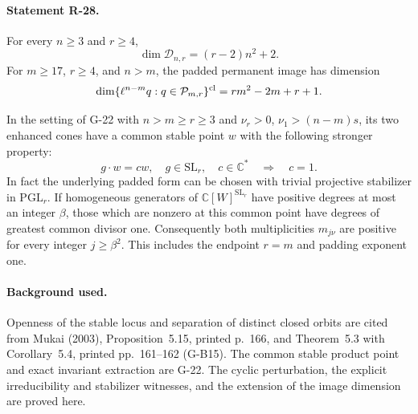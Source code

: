 \paragraph{Statement R-28.}
For every $n\geq3$ and $r\geq4$,
\begin{equation}\label{R28:det_dimension}
 \dim\mathcal D_{n,r}=(r-2)n^2+2.
\end{equation}
For $m\geq17$, $r\geq4$, and $n>m$, the padded permanent
image has dimension
\begin{equation}\label{R28:pad_dimension}
 \dim\{\ell^{n-m}q:q\in\mathcal P_{m,r}\}^{\rm cl}
       =rm^2-2m+r+1.
\end{equation}

In the setting of G-22 with $n>m\geq r\geq3$ and
$\nu_r>0$, $\nu_1>(n-m)s$, its two enhanced cones have a
common stable point $w$ with the following stronger property:
\begin{equation}\label{R28:no_scaling}
 g\cdot w=cw,\quad g\in\mathrm{SL}_r,\quad c\in\mathbb C^*
       \quad\Longrightarrow\quad c=1.
\end{equation}
In fact the underlying padded form can be chosen with trivial
projective stabilizer in $\mathrm{PGL}_r$.
If homogeneous generators of $\mathbb C[W]^{\mathrm{SL}_r}$
have positive degrees at most an integer $\beta$, those which
are nonzero at this common point have degrees of greatest common
divisor one. Consequently both multiplicities $m_{j\nu}$ are
positive for every integer $j\geq\beta^2$.
This includes the endpoint $r=m$ and padding exponent one.

\paragraph{Background used.}
Openness of the stable locus and separation of distinct closed
orbits are cited from Mukai (2003), Proposition~5.15, printed
p.~166, and Theorem~5.3 with Corollary~5.4, printed pp.~161--162
(G-B15). The common stable product point and exact invariant
extraction are G-22. The cyclic perturbation, the explicit
irreducibility and stabilizer witnesses, and the extension of
the image dimension are proved here.

